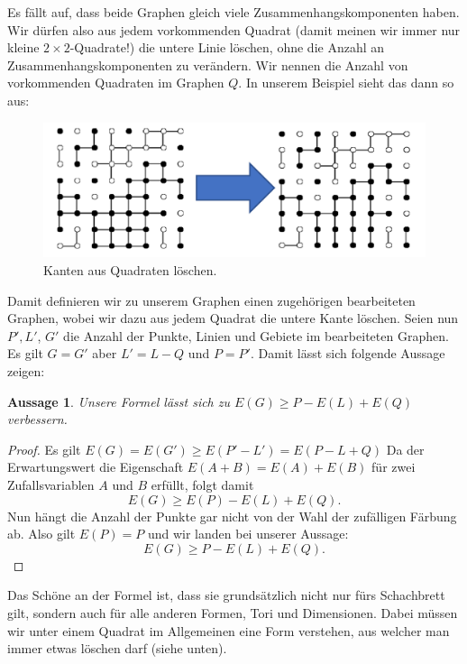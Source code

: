 \documentclass[11pt,a4paper]{article}
\numberwithin{equation}{section}
\numberwithin{table}{section}
\numberwithin{figure}{section}
\newtheorem{aussage}[satz]{Aussage}
\begin{document}
\par\noindent 
Es fällt auf, dass beide Graphen gleich viele Zusammenhangskomponenten haben. Wir dürfen also aus jedem vorkommenden Quadrat (damit meinen wir immer nur kleine $2\times 2$-Quadrate!) die untere Linie löschen, ohne die Anzahl an Zusammenhangskomponenten zu verändern. Wir nennen die Anzahl von vorkommenden Quadraten im Graphen $Q$. \newpage
In unserem Beispiel sieht das dann so aus:
\begin{center} 
\begin{figure}[H]\label{bild11}
\begin{center}\includegraphics[scale=0.3]{11}
\caption{Kanten aus Quadraten löschen.}\end{center}
\end{figure}
\end{center}
Damit definieren wir zu unserem Graphen einen zugehörigen bearbeiteten Graphen, wobei wir dazu aus jedem Quadrat die untere Kante löschen. Seien nun $P', L'$, $G'$ die Anzahl der Punkte, Linien und Gebiete im bearbeiteten Graphen.
Es gilt $G=G'$ aber $L'=L-Q$ und $P=P'$. Damit lässt sich folgende Aussage zeigen:
\begin{aussage}
Unsere Formel lässt sich zu $E(G)\geq P-E(L)+E(Q)$ verbessern.
\end{aussage}
\begin{proof}
Es gilt $E(G)=E(G')\geq E(P'-L')=E(P-L+Q)$ Da der Erwartungswert die Eigenschaft $E(A+B)=E(A)+E(B)$ für zwei Zufallsvariablen $A$ und $B$ erfüllt, folgt damit $$ E(G)\geq E(P)-E(L)+E(Q).$$ Nun hängt die Anzahl der Punkte gar nicht von der Wahl der zufälligen Färbung ab. 
Also gilt $E(P)=P$ und wir landen bei unserer Aussage:
$$\boxed{E(G)\geq P-E(L)+E(Q).}$$
\end{proof}
\par\noindent Das Schöne an der Formel ist, dass sie grundsätzlich nicht nur fürs Schachbrett gilt, sondern auch für alle anderen Formen, Tori und Dimensionen. Dabei müssen wir unter einem Quadrat im Allgemeinen eine Form verstehen, aus welcher man immer etwas löschen darf (siehe unten).
\end{document}

